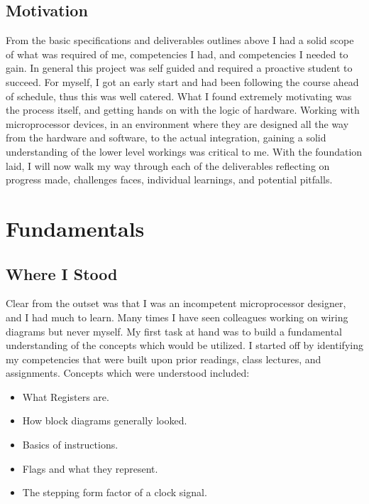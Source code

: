 \documentclass{article}
\begin{document}
\subsection{Motivation}
From the basic specifications and deliverables outlines above I had a solid scope of what was required of me, competencies I had, and competencies I needed to gain.
In general this project was self guided and required a proactive student to succeed.
For myself, I got an early start and had been following the course ahead of schedule, thus this was well catered.
What I found extremely motivating was the process itself, and getting hands on with the logic of hardware.
Working with microprocessor devices, in an environment where they are designed all the way from the hardware and software, to the actual integration, gaining a solid understanding of the lower level workings was critical to me.
With the foundation laid, I will now walk my way through each of the deliverables reflecting on progress made, challenges faces, individual learnings, and potential pitfalls.

\section{Fundamentals}
\subsection{Where I Stood}
Clear from the outset was that I was an incompetent microprocessor designer, and I had much to learn.
Many times I have seen colleagues working on wiring diagrams but never myself.
My first task at hand was to build a fundamental understanding of the concepts which would be utilized.
I started off by identifying my competencies that were built upon prior readings, class lectures, and assignments.
Concepts which were understood included:
\begin{itemize}
    \item[\(\diamond\)] What Registers are.
    \item[\(\diamond\)] How block diagrams generally looked.
    \item[\(\diamond\)] Basics of instructions.
    \item[\(\diamond\)] Flags and what they represent.
    \item[\(\diamond\)] The stepping form factor of a clock signal.
\end{itemize}
\end{document}

